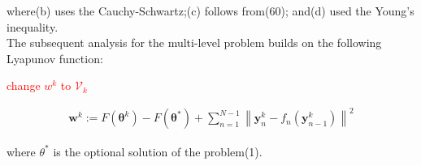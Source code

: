 where(b) uses the Cauchy-Schwartz;(c) follows from(60); and(d) used the Young's inequality.\\
The subsequent analysis for the multi-level problem builds on the following Lyapunov function:

\textcolor{red}{change $w^k$ to $\mathcal{V}_k$}

\begin{equation*}
\begin{split}
\boldsymbol{w}^k:=F(\boldsymbol{\theta}^k)-F(\boldsymbol{\theta}^*)+\sum_{n=1}^{N-1}\left \| \boldsymbol{y}_n^k-f_n(\boldsymbol{y}_{n-1}^k) \right \|^2
\end{split}
\end{equation*}

where $\theta^*$ is the optional solution of the problem(1).


